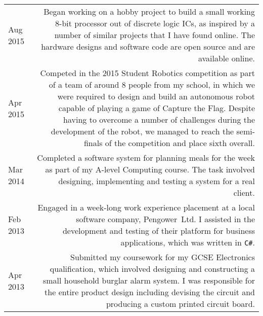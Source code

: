 
\vspace{-1.2em}

\begin{longtable}{L!{\sep}R}
    Aug 2015 &
    Began working on a hobby project to build a small working 8-bit processor out of discrete logic ICs, as inspired by a number of similar projects that I have found online. The hardware designs and software code are open source and are available online.
    \vspace{1.2em} \\

    Apr 2015 &
    Competed in the 2015 Student Robotics competition as part of a team of around 8 people from my school, in which we were required to design and build an autonomous robot capable of playing a game of Capture the Flag. Despite having to overcome a number of challenges during the development of the robot, we managed to reach the semi-finals of the competition and place sixth overall.
    \vspace{1.2em} \\

    Mar 2014 &
    Completed a software system for planning meals for the week as part of my A-level Computing course. The task involved designing, implementing and testing a system for a real client.
    \vspace{1.2em} \\


    Feb 2013 &
    Engaged in a week-long work experience placement at a local software company, \mbox{Pengower Ltd}. I assisted in the development and testing of their platform for business applications, which was written in \texttt{C\#}.
    \vspace{1.2em} \\

    Apr 2013 &
    Submitted my coursework for my GCSE Electronics qualification, which involved designing and constructing a small household burglar alarm system. I was responsible for the entire product design including devising the circuit and producing a custom printed circuit board.
    \vspace{1.2em} \\


\end{longtable}
